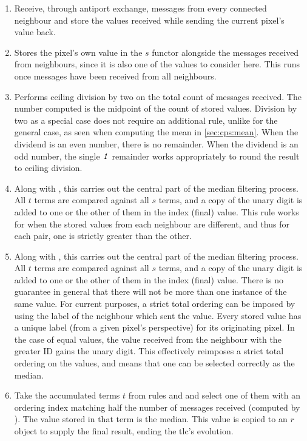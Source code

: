\begin{enumerate}
    \item Receive, through antiport exchange, messages from every connected neighbour and store the values received while sending the current pixel's value back.
    \item Stores the pixel's own value in the \(s\) functor alongside the messages received from neighbours, since it is also one of the values to consider here.  This runs once messages have been received from all neighbours.
    \item Performs ceiling division by two on the total count of messages received.  The number computed is the midpoint of the count of stored values.  Division by two as a special case does not require an additional rule, unlike for the general case, as seen when computing the mean in \vref{sec:cps:mean}.  When the dividend is an even number, there is no remainder.  When the dividend is an odd number, the single \(\mathit{1}\) remainder works appropriately to round the result to ceiling division.
    \item Along with , this carries out the central part of the median filtering process.  All \(t\) terms are compared against all \(s\) terms, and a copy of the unary digit is added to one or the other of them in the index (final) value.  This rule works for when the stored values from each neighbour are different, and thus for each pair, one is strictly greater than the other.
    \item Along with , this carries out the central part of the median filtering process.  All \(t\) terms are compared against all \(s\) terms, and a copy of the unary digit is added to one or the other of them in the index (final) value.  There is no guarantee in general that there will not be more than one instance of the same value.  For current purposes, a strict total ordering can be imposed by using the label of the neighbour which sent the value.  Every stored value has a unique label (from a given pixel's perspective) for its originating pixel.  In the case of equal values, the value received from the neighbour with the greater ID gains the unary digit.  This effectively reimposes a strict total ordering on the values, and means that one can be selected correctly as the median.
    \item Take the accumulated terms \(t\) from rules  and  and select one of them with an ordering index matching half the number of messages received (computed by ).  The value stored in that term is the median.  This value is copied to an \(r\) object to supply the final result, ending the \gls{tlc}'s evolution.
\end{enumerate}

